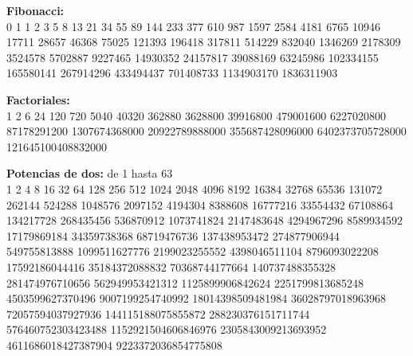 \documentclass[10pt,landscape,twocolumn,a4paper,notitlepage]{article}
\begin{document}
	\vspace{8mm}
	\textbf{Fibonacci:}\\
	\vspace{3mm}
	0 1 1 2 3 5 8 13 21 34 55 89 144 233 377 610 987 1597 2584 4181 6765 10946 17711 28657 46368 75025 121393 196418 317811
	514229 832040 1346269 2178309 3524578 5702887 9227465 14930352 24157817 39088169 63245986 102334155 165580141 267914296
	433494437 701408733 1134903170 1836311903
	
	\vspace{8mm}
	\textbf{Factoriales:}\\
	\vspace{3mm}
	1 2 6 24 120 720 5040 40320 362880 3628800 39916800 479001600 6227020800 87178291200 1307674368000 20922789888000
	355687428096000 6402373705728000 121645100408832000
	
	\vspace{8mm}
	\textbf{Potencias de dos:} de 1 hasta 63\\
	\vspace{3mm}
	1 2 4 8 16 32 64 128 256 512 1024 2048 4096 8192 16384 32768 65536 131072 262144 524288 1048576 2097152 4194304 8388608
	16777216 33554432 67108864 134217728 268435456 536870912 1073741824 2147483648 4294967296 8589934592 17179869184
	34359738368 68719476736 137438953472 274877906944 549755813888 1099511627776 2199023255552 4398046511104 8796093022208
	17592186044416 35184372088832 70368744177664 140737488355328 281474976710656 562949953421312 1125899906842624
	2251799813685248 4503599627370496 9007199254740992 18014398509481984 36028797018963968 72057594037927936
	144115188075855872 288230376151711744 576460752303423488 1152921504606846976 2305843009213693952 4611686018427387904
	9223372036854775808
\end{document}
